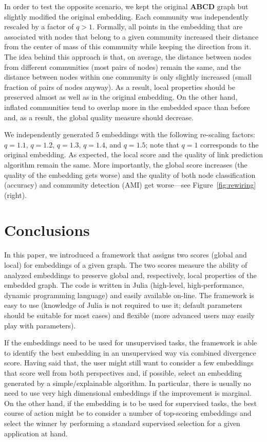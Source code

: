\documentclass[11pt]{article}
\begin{document}
\medskip

In order to test the opposite scenario, we kept the original \textbf{ABCD} graph but slightly modified the original embedding. Each community was independently rescaled by a factor of $q>1$. Formally, all points in the embedding that are associated with nodes that belong to a given community increased their distance from the center of mass of this community while keeping the direction from it. The idea behind this approach is that, on average, the distance between nodes from different communities (most pairs of nodes) remain the same, and the distance between nodes within one community is only slightly increased (small fraction of pairs of nodes anyway). As a result, local properties should be preserved almost as well as in the original embedding. On the other hand, inflated communities tend to overlap more in the embedded space than before and, as a result, the global quality measure should decrease. 

We independently generated 5 embeddings with the following re-scaling factors: $q=1.1$, $q=1.2$, $q=1.3$, $q=1.4$, and $q=1.5$; note that $q=1$ corresponds to the original embedding. As expected, the local score and the quality of link prediction algorithm remain the same. More importantly, the global score increases (the quality of the embedding gets worse) and the quality of both node classification (accuracy) and community detection (AMI) get worse---see Figure~\ref{fig:rewiring} (right). 

\section{Conclusions}\label{sec:conclusions}

In this paper, we introduced a framework that assigns two scores (global and local) for embeddings of a given graph. The two scores measure the ability of analyzed embeddings to preserve global and, respectively, local properties of the embedded graph. The code is written in Julia (high-level, high-performance, dynamic programming language) and easily available on-line. The framework is easy to use (knowledge of Julia is not required to use it; default parameters should be suitable for most cases) and flexible (more advanced users may easily play with parameters). 

If the embeddings need to be used for unsupervised tasks, the framework is able to identify the best embedding in an unsupervised way via combined divergence score. Having said that, the user might still want to consider a few embeddings that score well from both perspectives and, if possible, select an embedding generated by a simple/explainable algorithm. In particular, there is usually no need to use very high dimensional embeddings if the improvement is marginal. On the other hand, if the embedding is to be used for supervised tasks, the best course of action might be to consider a number of top-scoring embeddings and select the winner by performing a standard supervised selection for a given application at hand. 
\end{document}
